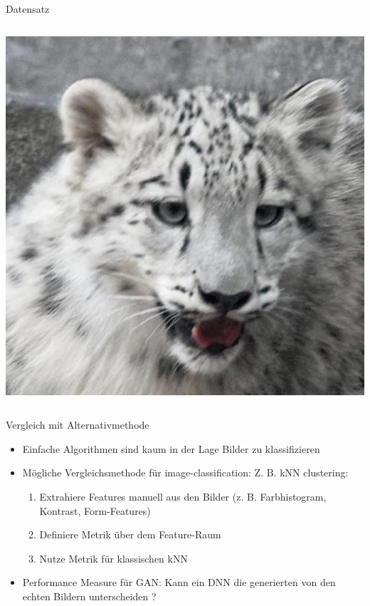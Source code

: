 \documentclass[aspectratio=1610, 9pt]{beamer}
\begin{document}
\begin{frame}{Datensatz}
\begin{columns}
    \includegraphics[scale=0.13]{images/wildlife.jpg}\\
    
  \end{columns}
\end{frame}

\begin{frame}{Vergleich mit Alternativmethode}
  \begin{itemize}
  \item Einfache Algorithmen sind kaum in der Lage Bilder zu klassifizieren
  \item Mögliche Vergleichsmethode für image-classification: Z. B. kNN clustering:
    \begin{enumerate}
    \item Extrahiere Features manuell aus den Bilder (z. B. Farbhistogram, Kontrast, Form-Features)
    \item Definiere Metrik über dem Feature-Raum
    \item Nutze Metrik für klassischen kNN
    \end{enumerate}
  \item Performance Measure für GAN: Kann ein DNN die generierten von den echten Bildern unterscheiden ?
  \end{itemize}
  
\end{frame}
\end{document}
